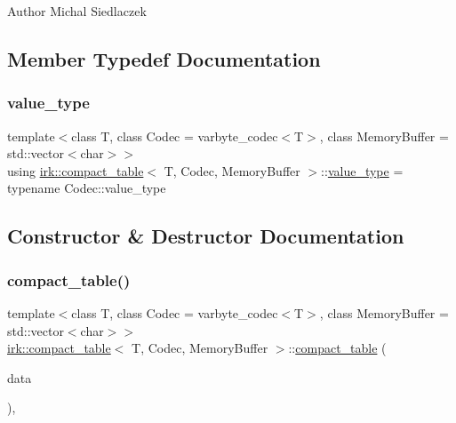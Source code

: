 \begin{DoxyAuthor}{Author}
Michal Siedlaczek 
\end{DoxyAuthor}


\subsection{Member Typedef Documentation}
\mbox{\label{classirk_1_1compact__table_accd2a370a48a5873af0625d56d732d71}} 
\subsubsection{\texorpdfstring{value\+\_\+type}{value\_type}}
{\footnotesize\ttfamily template$<$class T, class Codec = varbyte\+\_\+codec$<$\+T$>$, class Memory\+Buffer = std\+::vector$<$char$>$$>$ \\
using \mbox{\hyperlink{classirk_1_1compact__table}{irk\+::compact\+\_\+table}}$<$ T, Codec, Memory\+Buffer $>$\+::\mbox{\hyperlink{classirk_1_1compact__table_accd2a370a48a5873af0625d56d732d71}{value\+\_\+type}} =  typename Codec\+::value\+\_\+type}



\subsection{Constructor \& Destructor Documentation}
\mbox{\label{classirk_1_1compact__table_a7837dc73daa2b72450bca208a4a315bb}} 
\subsubsection{\texorpdfstring{compact\+\_\+table()}{compact\_table()}\hspace{0.1cm}{\footnotesize\ttfamily [1/3]}}
{\footnotesize\ttfamily template$<$class T, class Codec = varbyte\+\_\+codec$<$\+T$>$, class Memory\+Buffer = std\+::vector$<$char$>$$>$ \\
\mbox{\hyperlink{classirk_1_1compact__table}{irk\+::compact\+\_\+table}}$<$ T, Codec, Memory\+Buffer $>$\+::\mbox{\hyperlink{classirk_1_1compact__table}{compact\+\_\+table}} (\begin{DoxyParamCaption}\item[{Memory\+Buffer}]{data }\end{DoxyParamCaption})\hspace{0.3cm}{\ttfamily [inline]}, {\ttfamily [explicit]}}

